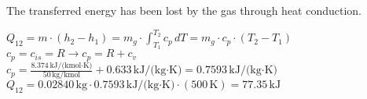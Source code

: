 The transferred energy has been lost by the gas through heat conduction.  

\( Q_{12} = m \cdot (h_2 - h_1) = m_g \cdot \int_{T_1}^{T_2} c_p \, dT = m_g \cdot c_p \cdot (T_2 - T_1) \)  
\( c_p = c_{is} = R \to c_p = R + c_v \)  
\( c_p = \frac{8.374 \, \text{kJ/(kmol·K)}}{50 \, \text{kg/kmol}} + 0.633 \, \text{kJ/(kg·K)} = 0.7593 \, \text{kJ/(kg·K)} \)  
\( Q_{12} = 0.02840 \, \text{kg} \cdot 0.7593 \, \text{kJ/(kg·K)} \cdot (500 \, \text{K}) = 77.35 \, \text{kJ} \)